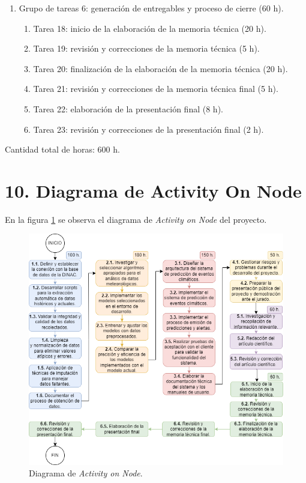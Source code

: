 \documentclass[
11pt, %
codirector, %
]{charter}
\begin{document}
\begin{enumerate}
\begin{enumerate}
	\end{enumerate}		
\item Grupo de tareas 6: generación de entregables y proceso de cierre (60 h).
\begin{enumerate}
	\item Tarea 18: inicio de la elaboración de la memoria técnica (20 h).
	\item Tarea 19: revisión y correcciones de la memoria técnica (5 h).
	\item Tarea 20: finalización de la elaboración de la memoria técnica (20 h).
	\item Tarea 21: revisión y correcciones de la memoria técnica final (5 h).
	\item Tarea 22: elaboración de la presentación final (8 h).
	\item Tarea 23: revisión y correcciones de la presentación final (2 h).
	\end{enumerate}
\end{enumerate}

Cantidad total de horas: 600 h.

\section{10. Diagrama de Activity On Node}
\label{sec:AoN}

En la figura \ref{fig:AoN} se observa el diagrama de \textit{Activity on Node} del proyecto. 

\begin{figure}[htpb]
\centering 
\includegraphics[width=.8\textwidth]{./Figuras/AoN.png}
\caption{Diagrama de \textit{Activity on Node}.}
\label{fig:AoN}
\end{figure}
\end{document}
